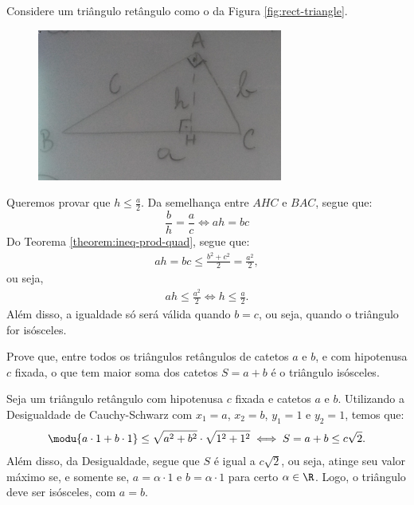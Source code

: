 \begin{solution}
Considere um triângulo retângulo como o da Figura \ref{fig:rect-triangle}.
%
\label{fig:rect-triangle}
\begin{figure}[H]
\includegraphics{../../res/img/03-triangle.png}
\centering
\end{figure}
%
Queremos provar que $h \le \frac a 2$. Da semelhança entre $AHC$ e $BAC$, segue que:
%
\begin{equation*} 
\frac b h = \frac a c \iff ah = bc
\end{equation*} 
%
Do Teorema \ref{theorem:ineq-prod-quad}, segue que:
%
\begin{align*}
ah = bc \le \frac {b^2 + c^2} 2 = \frac {a^2} 2,
\end{align*}
%
ou seja, 
%
\begin{align*}
ah \le \frac {a^2} 2 \iff h \le \frac a 2.
\end{align*}
%
Além disso, a igualdade só será válida quando $b=c$, ou seja, quando o triângulo for isósceles.
\end{solution}

\begin{example}
Prove que, entre todos os triângulos retângulos de catetos $a$ e $b$, e com hipotenusa $c$ fixada, o que tem maior soma dos catetos
$S = a+b$ é o triângulo isósceles.
\end{example}

\begin{solution}
Seja um triângulo retângulo com hipotenusa $c$ fixada e catetos $a$ e $b$. Utilizando a Desigualdade de Cauchy-Schwarz com $x_1 = a$, $x_2 = b$, $y_1 = 1$ e $y_2 = 1$, temos que:
%
\begin{align*}
\modu {a \cdot 1 + b \cdot 1} \le \sqrt{a^2 + b^2} \cdot \sqrt{1^2 + 1^2} \iff S = a+b \le c\sqrt 2.
\end{align*}
%
Além disso, da Desigualdade, segue que $S$ é igual a $c\sqrt 2$, ou seja, atinge seu valor máximo se, e somente se, $a = \alpha \cdot 1$ e $b = \alpha \cdot 1$ para certo $\alpha \in \R$. Logo, o triângulo deve ser isósceles, com $a=b$.
\end{solution}